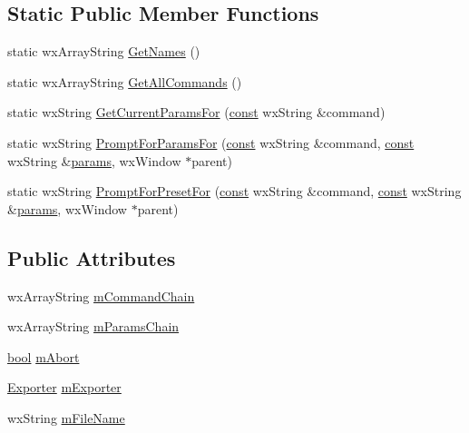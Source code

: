 \subsection*{Static Public Member Functions}
\begin{DoxyCompactItemize}
\item 
static wx\+Array\+String \hyperlink{class_batch_commands_acb85a59c30d89d8eee466f8ea3db761f}{Get\+Names} ()
\item 
static wx\+Array\+String \hyperlink{class_batch_commands_a34090d08dba13e7dfa5db5080e5bd29a}{Get\+All\+Commands} ()
\item 
static wx\+String \hyperlink{class_batch_commands_aa180af1e082818e7b92202d2a0677304}{Get\+Current\+Params\+For} (\hyperlink{getopt1_8c_a2c212835823e3c54a8ab6d95c652660e}{const} wx\+String \&command)
\item 
static wx\+String \hyperlink{class_batch_commands_aa0c02a98cc348c0cde14389702285b36}{Prompt\+For\+Params\+For} (\hyperlink{getopt1_8c_a2c212835823e3c54a8ab6d95c652660e}{const} wx\+String \&command, \hyperlink{getopt1_8c_a2c212835823e3c54a8ab6d95c652660e}{const} wx\+String \&\hyperlink{_reverb_8cpp_aacc5617877d2aa4d17c729c1c8ba4eec}{params}, wx\+Window $\ast$parent)
\item 
static wx\+String \hyperlink{class_batch_commands_ad2f1108e20edae7aa10fc2b7a9b6f83f}{Prompt\+For\+Preset\+For} (\hyperlink{getopt1_8c_a2c212835823e3c54a8ab6d95c652660e}{const} wx\+String \&command, \hyperlink{getopt1_8c_a2c212835823e3c54a8ab6d95c652660e}{const} wx\+String \&\hyperlink{_reverb_8cpp_aacc5617877d2aa4d17c729c1c8ba4eec}{params}, wx\+Window $\ast$parent)
\end{DoxyCompactItemize}
\subsection*{Public Attributes}
\begin{DoxyCompactItemize}
\item 
wx\+Array\+String \hyperlink{class_batch_commands_a692e3da8d53f0f6e96fff2a762d36030}{m\+Command\+Chain}
\item 
wx\+Array\+String \hyperlink{class_batch_commands_ac462b94f6422cae948ad4fc809ced592}{m\+Params\+Chain}
\item 
\hyperlink{mac_2config_2i386_2lib-src_2libsoxr_2soxr-config_8h_abb452686968e48b67397da5f97445f5b}{bool} \hyperlink{class_batch_commands_ae7ba0db73a71a952c18d601678c9549e}{m\+Abort}
\item 
\hyperlink{class_exporter}{Exporter} \hyperlink{class_batch_commands_afcbf772d7e4849302141eccfcf5874ce}{m\+Exporter}
\item 
wx\+String \hyperlink{class_batch_commands_a3149a962faa40188807249b091089c6e}{m\+File\+Name}
\end{DoxyCompactItemize}


